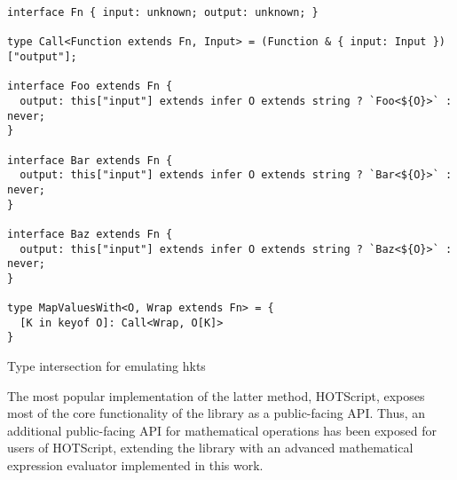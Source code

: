 \begin{listing}[ht]
  \begin{verbatim}
interface Fn { input: unknown; output: unknown; }

type Call<Function extends Fn, Input> = (Function & { input: Input })["output"];

interface Foo extends Fn {
  output: this["input"] extends infer O extends string ? `Foo<${O}>` : never;
}

interface Bar extends Fn {
  output: this["input"] extends infer O extends string ? `Bar<${O}>` : never;
}

interface Baz extends Fn {
  output: this["input"] extends infer O extends string ? `Baz<${O}>` : never;
}

type MapValuesWith<O, Wrap extends Fn> = {
  [K in keyof O]: Call<Wrap, O[K]>
}
\end{verbatim}
  \caption{Type intersection for emulating \acrshort{hkt}s}\label{lst:emulating-hkt}
\end{listing}

The most popular implementation of the latter method, HOTScript, exposes most of the core functionality of the library as a public-facing API. Thus, an additional public-facing API for mathematical operations has been exposed for users of HOTScript, extending the library with an advanced mathematical expression evaluator implemented in this work.
